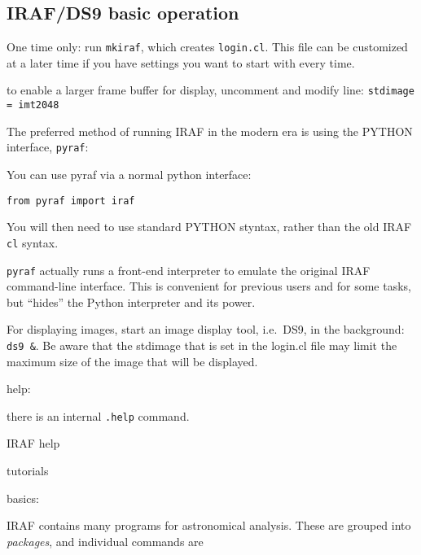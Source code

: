\documentclass{article}
\begin{document}
\subsection*{IRAF/DS9 basic operation}
\begin{itemize*}
    \item One time only: run \texttt{mkiraf}, which creates \texttt{login.cl}.
        This file can be customized at a later time if you have settings you want
        to start with every time.
        \begin{itemize*}
            \item to enable a larger frame buffer for display, uncomment and
                modify line: \texttt{stdimage = imt2048}
        \end{itemize*}
    \item The preferred method of running IRAF in the modern era is using the
        PYTHON interface, \texttt{pyraf}:
        \begin{itemize*}
            \item You can use pyraf via a normal python interface:

                \texttt{from pyraf import iraf}

                You will then need to use standard PYTHON styntax, rather
                than the old IRAF \texttt{cl} syntax.
            \item \texttt{pyraf} actually runs a front-end interpreter to
                emulate the original IRAF command-line interface. This is
                convenient for previous users and for some tasks, but
                ``hides'' the Python interpreter and its power.
        \end{itemize*}
    \item For displaying images, start an image display tool, i.e.\ DS9,
        in the background: \texttt{ds9 \&}. Be aware that the stdimage that is set
        in the login.cl file may limit the maximum size of the image that will
        be displayed.
    \item help:
        \begin{itemize*}
            \item there is an internal \texttt{.help} command.
            \item IRAF help
            \item tutorials
        \end{itemize*}
    \item basics:
        \begin{itemize*}
            \item IRAF contains many programs for astronomical analysis. These
                are grouped into \emph{packages}, and individual commands are
        \end{itemize*}
\end{itemize*}
\end{document}
